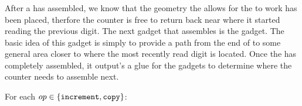 \subsubsection{ \returnpath }
After a {\dtop} has assembled, we know that the geometry the allows for the {\warpunit} to
work has been placed, therfore the counter is free to return back near where it started
reading the previous digit. The next gadget that assembles is the {\returnpath} gadget.
The basic idea of this gadget is simply to provide a path from the end of {\dtop} to some
general area closer to where the most recently read digit is located. Once the {\returnpath} has
completely assembled, it output's a glue for the {\nextread} gadgets to determine
where the counter needs to assemble next.


For each $op\in \{ {\tt increment}, {\tt copy} \}$:

